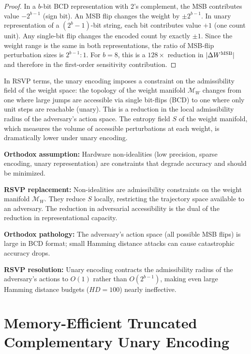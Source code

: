 \documentclass[11pt, openright, twoside]{book}
\theoremstyle{plain}
\theoremstyle{definition}
\theoremstyle{remark}
\newcommand{\Sfield}{S}
\begin{document}
\begin{proof}
In a $b$-bit BCD representation with 2's complement, the MSB contributes value $-2^{b-1}$
(sign bit). An MSB flip changes the weight by $\pm 2^{b-1}$. In unary representation of
a $(2^b-1)$-bit string, each bit contributes value $+1$ (one count unit). Any single-bit
flip changes the encoded count by exactly $\pm 1$. Since the weight range is the same
in both representations, the ratio of MSB-flip perturbation sizes is $2^{b-1}:1$.
For $b=8$, this is a $128\times$ reduction in $|\Delta W^{\rm MSB}|$ and therefore
in the first-order sensitivity contribution.
\end{proof}

In RSVP terms, the unary encoding imposes a constraint on the admissibility field of the
weight space: the topology of the weight manifold $\mathcal{M}_W$ changes from one where
large jumps are accessible via single bit-flips (BCD) to one where only unit steps are
reachable (unary). This is a reduction in the local admissibility radius of the adversary's
action space. The entropy field $\Sfield$ of the weight manifold, which measures the volume
of accessible perturbations at each weight, is dramatically lower under unary encoding.

\begin{compbox}
\textbf{Orthodox assumption:} Hardware non-idealities (low precision, sparse encoding,
unary representation) are constraints that degrade accuracy and should be minimized.

\textbf{RSVP replacement:} Non-idealities are admissibility constraints on the weight
manifold $\mathcal{M}_W$. They reduce $\Sfield$ locally, restricting the trajectory space
available to an adversary. The reduction in adversarial accessibility is the dual of the
reduction in representational capacity.

\textbf{Orthodox pathology:} The adversary's action space (all possible MSB flips) is
large in BCD format; small Hamming distance attacks can cause catastrophic accuracy drops.

\textbf{RSVP resolution:} Unary encoding contracts the admissibility radius of the
adversary's actions to $O(1)$ rather than $O(2^{b-1})$, making even large Hamming
distance budgets ($HD=100$) nearly ineffective.
\end{compbox}

\section{Memory-Efficient Truncated Complementary Unary Encoding}
\end{document}
